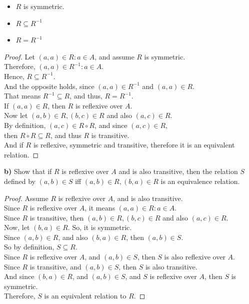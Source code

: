\documentclass[titlepage, letterpaper, fleqn]{article}
\newcommand{\spacepls}{\vspace{5mm}}
\begin{document}
\begin{itemize}
	\item \(R\) is symmetric.
	\item \(R \subseteq R^{-1}\)
	\item \(R = R^{-1}\)
\end{itemize}

\begin{proof}
Let \((a,a) \in R : a \in A\), and assume \(R\) is symmetric.\\
Therefore, \((a,a) \in R^{-1} : a \in A\).\\
Hence, \(R \subseteq R^{-1}\).\\
And the opposite holds, since \((a,a) \in R^{-1}\) and \((a,a) \in R\).\\
That means \(R^{-1} \subseteq R\), and thus, \(R = R^{-1}\).\\
If \((a,a) \in R\), then \(R\) is reflexive over \(A\).\\
Now let \((a,b) \in R, (b,c) \in R\) and also \((a,c) \in R\).\\
By definition, \((a,c) \in R \circ R\), and since \((a,c) \in R\),\\
then \(R \circ R \subseteq R\), and thus \(R\) is transitive.\\
And if \(R\) is reflexive, symmetric and transitive, therefore it is an equivalent relation.
\end{proof}

\spacepls

{\large \textbf{b)} Show that if \(R\) is reflexive over \(A\) and is also transitive, then the relation \(S\) defined by \((a,b) \in S\) iff \((a,b) \in R, (b,a) \in R\) is an equivalence relation.}

\begin{proof}
Assume \(R\) is reflexive over \(A\), and is also transitive.\\
Since \(R\) is reflexive over \(A\), it means \((a,a) \in R: a \in A\).\\
Since \(R\) is transitive, then \((a,b) \in R, (b,c) \in R\) and also \((a,c) \in R\).\\
Now, let \((b,a) \in R\). So, it is symmetric.\\
Since \((a,b) \in R\), and also \((b,a) \in R\), then \((a,b) \in S\).\\
So by definition, \(S \subseteq R\).\\
Since \(R\) is reflexive over \(A\), and \((a,b) \in S\), then \(S\) is also reflexive over \(A\).\\
Since \(R\) is transitive, and \((a,b) \in S\), then \(S\) is also transitive.\\
And since \((b,a) \in R\), and \((a,b) \in S\), and \(S\) is reflexive over \(A\), then \(S\) is symmetric.\\
Therefore, \(S\) is an equivalent relation to \(R\).
\end{proof}
\end{document}
